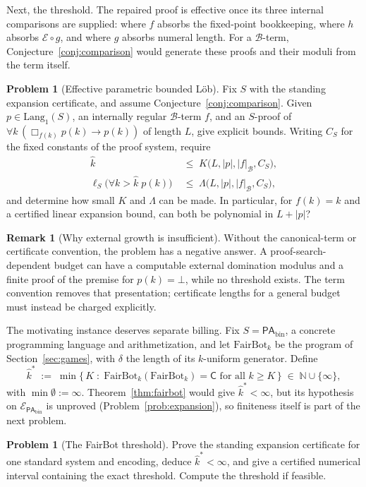 \documentclass[11pt]{amsart}
\theoremstyle{plain}
\theoremstyle{definition}
\newtheorem{problem}[theorem]{Problem}
\newtheorem{remark}[theorem]{Remark}
\newcommand{\PAbin}{\mathsf{PA}_{\mathrm{bin}}}
\newcommand{\Lang}{\mathrm{Lang}}
\newcommand{\FB}{\mathrm{FairBot}}
\newcommand{\Bud}{\mathcal{B}}
\begin{document}
Next, the threshold. The repaired proof is effective once its three internal comparisons are supplied: where $f$ absorbs the fixed-point bookkeeping, where $h$ absorbs $\mathcal E\circ g$, and where $g$ absorbs numeral length. For a $\Bud$-term, Conjecture~\ref{conj:comparison} would generate these proofs and their moduli from the term itself.

\begin{problem}[Effective parametric bounded L\"ob]
\label{prob:effective}
Fix $S$ with the standing expansion certificate, and assume Conjecture~\ref{conj:comparison}. Given $p\in\Lang_1(S)$, an internally regular $\Bud$-term $f$, and an $S$-proof of $\forall k\,(\Box_{f(k)}p(k)\to p(k))$ of length $L$, give explicit bounds. Writing $C_S$ for the fixed constants of the proof system, require
\[
\begin{aligned}
\hat{k}
  &\;\le\; K\bigl(L,|p|,|f|_{\Bud},C_S\bigr),\\
\ell_S\bigl(\forall k>\hat{k}\;p(k)\bigr)
  &\;\le\; \Lambda\bigl(L,|p|,|f|_{\Bud},C_S\bigr),
\end{aligned}
\]
and determine how small $K$ and $\Lambda$ can be made. In particular, for $f(k)=k$ and a certified linear expansion bound, can both be polynomial in $L+|p|$?
\end{problem}

\begin{remark}[Why external growth is insufficient]
Without the canonical-term or certificate convention, the problem has a negative answer. A proof-search-dependent budget can have a computable external domination modulus and a finite proof of the premise for $p(k)=\bot$, while no threshold exists. The term convention removes that presentation; certificate lengths for a general budget must instead be charged explicitly.
\end{remark}

The motivating instance deserves separate billing. Fix $S=\PAbin$, a concrete programming language and arithmetization, and let $\FB_k$ be the program of Section~\ref{sec:games}, with $\delta$ the length of its $k$-uniform generator. Define
\[
\hat{k}^{*} \;:=\; \min\{\, K \;:\; \FB_k(\FB_k) = \mathsf{C} \text{ for all } k \ge K \,\} \;\in\; \mathbb{N} \cup \{\infty\},
\]
with $\min\emptyset := \infty$. Theorem~\ref{thm:fairbot} would give $\hat{k}^{*} < \infty$, but its hypothesis on $\mathcal{E}_{\PAbin}$ is unproved (Problem~\ref{prob:expansion}), so finiteness itself is part of the next problem.

\begin{problem}[The FairBot threshold]
\label{prob:fairbot}
Prove the standing expansion certificate for one standard system and encoding, deduce $\hat{k}^{*}<\infty$, and give a certified numerical interval containing the exact threshold. Compute the threshold if feasible.
\end{problem}
\end{document}
